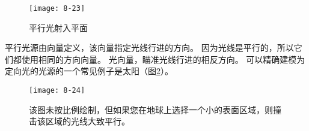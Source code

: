 \begin{figure}[h]
    \label{fig:8-23}
    \texttt{[image: 8-23]}
    \centering
    \caption{平行光射入平面}
\end{figure}

\begin{flushleft}
平行光源由向量定义，该向量指定光线行进的方向。 因为光线是平行的，所以它们都使用相同的方向向量。 光向量，瞄准光线行进的相反方向。 可以精确建模为定向光的光源的一个常见例子是太阳（图\ref{fig:8-24}）。
\end{flushleft}

\begin{figure}[h]
    \label{fig:8-24}
    \texttt{[image: 8-24]}
    \centering
    \caption{该图未按比例绘制，但如果您在地球上选择一个小的表面区域，则撞击该区域的光线大致平行。}
\end{figure}

